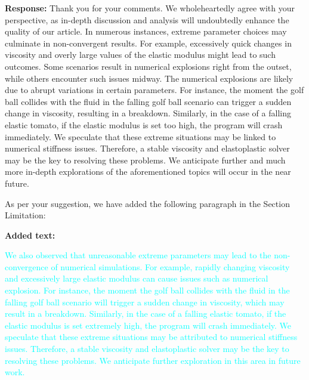 \documentclass[12pt,a4paper]{article}
\newcommand{\revised}[1]{\textcolor{cyan}{#1}}
\begin{document}
\vspace{0.2cm}
\textbf{Response:}
Thank you for your comments. We wholeheartedly agree with your perspective, as in-depth discussion and analysis will undoubtedly enhance the quality of our article. In numerous instances, extreme parameter choices may culminate in non-convergent results. For example, excessively quick changes in viscosity and overly large values of the elastic modulus might lead to such outcomes. Some scenarios result in numerical explosions right from the outset, while others encounter such issues midway. The numerical explosions are likely due to abrupt variations in certain parameters. For instance, the moment the golf ball collides with the fluid in the falling golf ball scenario can trigger a sudden change in viscosity, resulting in a breakdown. Similarly, in the case of a falling elastic tomato, if the elastic modulus is set too high, the program will crash immediately. We speculate that these extreme situations may be linked to numerical stiffness issues. Therefore, a stable viscosity and elastoplastic solver may be the key to resolving these problems. We anticipate further and much more in-depth explorations of the aforementioned topics will occur in the near future. 

As per your suggestion, we have added the following paragraph in the Section Limitation:

\vspace{0.2cm}
\textbf{Added text:}

\revised{We also observed that unreasonable extreme parameters may lead to the non-convergence of numerical simulations. For example, rapidly changing viscosity and excessively large elastic modulus can cause issues such as numerical explosion. 
For instance, the moment the golf ball collides with the fluid in the falling golf ball scenario will trigger a sudden change in viscosity, which may result in a breakdown. Similarly, in the case of a falling elastic tomato, if the elastic modulus is set extremely high, the program will crash immediately. We speculate that these extreme situations may be attributed to numerical stiffness issues. Therefore, a stable viscosity and elastoplastic solver may be the key to resolving these problems. We anticipate further exploration in this area in future work.}
\end{document}
